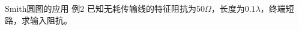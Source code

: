 \begin{frame}{Smith圆图的应用}
  例2 \quad 已知无耗传输线的特征阻抗为$50\Omega$，长度为$0.1\lambda$，终端短路，求输入阻抗。
  \begin{columns}
    \begin{column}{0.4\linewidth}
    \end{column}
    \begin{column}{0.6\linewidth}

\end{column}
\end{columns}
\end{frame}
